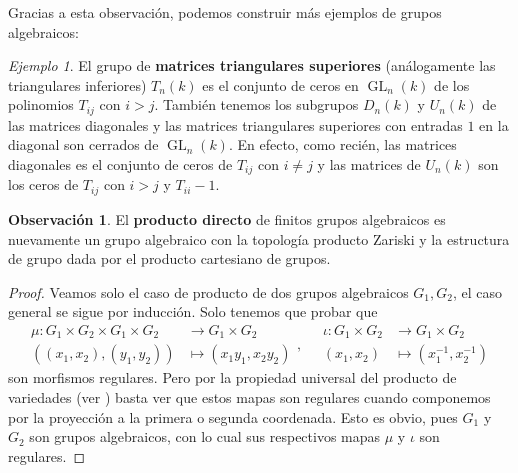 \documentclass[spanish,10pt]{amsart}
\theoremstyle{definition}
\newtheorem{obs}[theorem]{Observación}
\theoremstyle{remark}
\newtheorem{example}[theorem]{Ejemplo}
\numberwithin{equation}{section}
\begin{document}
Gracias a esta observación, podemos construir más ejemplos de grupos algebraicos:
\begin{example}
El grupo de \textbf{matrices triangulares superiores} (análogamente las triangulares inferiores) $T_n (k)$ es el conjunto de ceros en $\operatorname{GL}_n (k)$ de los polinomios $T_{ij}$ con $i >j$. También tenemos los subgrupos $D_n (k)$ y $U_n (k)$ de las matrices diagonales y las matrices triangulares superiores con entradas $1$ en la diagonal son cerrados de $\operatorname{GL}_n (k)$. En efecto, como recién, las matrices diagonales es el conjunto de ceros de $T_{ij}$ con $i \neq j$ y las matrices de $U_n (k)$ son los ceros de $T_{ij}$ con $i > j$ y $T_{ii} - 1$.
\end{example}

\begin{obs}
El \textbf{producto directo} de finitos grupos algebraicos es nuevamente un grupo algebraico con la topología producto Zariski y la estructura de grupo dada por el producto cartesiano de grupos.
\end{obs}
\begin{proof}
Veamos solo el caso de producto de dos grupos algebraicos $G_1, G_2$, el caso general se sigue por inducción. Solo tenemos que probar que
\[
    \begin{array}{ll}
    \mu : G_1 \times G_2 \times G_1 \times G_2 &\longrightarrow G_1 \times G_2 \\
    ((x_1,x_2),(y_1,y_2)) &\longmapsto (x_1 y_1, x_2 y_2)
    \end{array}, \quad
    \begin{array}{ll}
    \iota : G_1 \times G_2 &\longrightarrow G_1 \times G_2 \\
    (x_1, x_2) &\longmapsto (x_1^{-1}, x_2^{-1})
    \end{array}
\]
son morfismos regulares. Pero por la propiedad universal del producto de variedades (ver \cite[Teorema 2.6.5.]{notas_pedro}) basta ver que estos mapas son regulares cuando componemos por la proyección a la primera o segunda coordenada. Esto es obvio, pues $G_1$ y $G_2$ son grupos algebraicos, con lo cual sus respectivos mapas $\mu$ y $\iota$ son regulares.
\end{proof}
\end{document}
